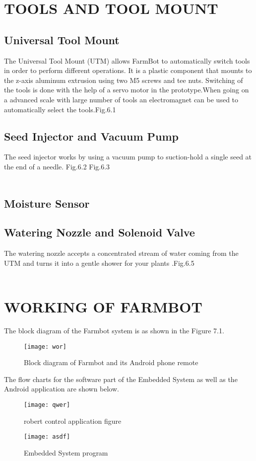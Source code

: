 \documentclass[12pt,a4paper]{report}
\begin{document}
\chapter{{TOOLS AND TOOL MOUNT}}
\section{Universal Tool Mount}
\hspace*{1cm} The Universal Tool Mount (UTM) allows FarmBot  to automatically switch tools in order to perform different operations. It is a plastic component that mounts to the z-axis aluminum extrusion using two M5 screws and tee nuts. Switching of the tools is done with the help of a servo motor in the prototype.When going on a advanced scale with large number of tools an electromagnet can be used to automatically select the tools.Fig.6.1
\section{Seed Injector and Vacuum Pump}
\hspace*{1cm} The seed injector works by using a vacuum pump to suction-hold a single seed at the end of a needle. Fig.6.2 Fig.6.3\\\
\section{Moisture Sensor}
\section{Watering Nozzle and Solenoid Valve}
\hspace*{1cm}The watering nozzle accepts a concentrated stream of water coming from the UTM and turns it into a gentle shower for your plants .Fig.6.5\\\
\chapter{WORKING OF FARMBOT}
\hspace*{1cm}The block diagram of the Farmbot system is as shown in the Figure 7.1. 
\begin{figure}[h!]
\centering
\texttt{[image: wor]}
\caption{Block diagram of Farmbot and its Android phone remote}
\label{circuit}
\end{figure}
\hspace*{1cm}
The flow charts for the software part of the Embedded System as well as the Android application are shown below.
\begin{figure}[h!]
\centering
\texttt{[image: qwer]}
\caption{robert control application figure}
\label{circuit}
\end{figure}
\begin{figure}[h!]
\centering
\texttt{[image: asdf]}
\caption{Embedded System program}
\label{circuit}
\end{figure}
\end{document}
